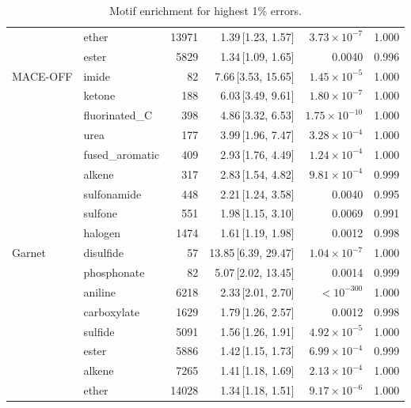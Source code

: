 \begin{table}[t]
\begin{tabular}{llrrrr}
      & ether & 13971 & 1.39\,[1.23, 1.57] & $3.73\times 10^{-7}$ & 1.000 \\
      & ester & 5829 & 1.34\,[1.09, 1.65] & 0.0040 & 0.996 \\
    \hline
    MACE-OFF & imide & 82 & 7.66\,[3.53, 15.65] & $1.45\times 10^{-5}$ & 1.000 \\
      & ketone & 188 & 6.03\,[3.49, 9.61] & $1.80\times 10^{-7}$ & 1.000 \\
      & fluorinated\_C & 398 & 4.86\,[3.32, 6.53] & $1.75\times 10^{-10}$ & 1.000 \\
      & urea & 177 & 3.99\,[1.96, 7.47] & $3.28\times 10^{-4}$ & 1.000 \\
      & fused\_aromatic & 409 & 2.93\,[1.76, 4.49] & $1.24\times 10^{-4}$ & 1.000 \\
      & alkene & 317 & 2.83\,[1.54, 4.82] & $9.81\times 10^{-4}$ & 0.999 \\
      & sulfonamide & 448 & 2.21\,[1.24, 3.58] & 0.0040 & 0.995 \\
      & sulfone & 551 & 1.98\,[1.15, 3.10] & 0.0069 & 0.991 \\
      & halogen & 1474 & 1.61\,[1.19, 1.98] & 0.0012 & 0.998 \\
    \hline
    Garnet & disulfide & 57 & 13.85\,[6.39, 29.47] & $1.04\times 10^{-7}$ & 1.000 \\
      & phosphonate & 82 & 5.07\,[2.02, 13.45] & 0.0014 & 0.999 \\
      & aniline & 6218 & 2.33\,[2.01, 2.70] & $< 10^{-300}$ & 1.000 \\
      & carboxylate & 1629 & 1.79\,[1.26, 2.57] & 0.0012 & 0.998 \\
      & sulfide & 5091 & 1.56\,[1.26, 1.91] & $4.92\times 10^{-5}$ & 1.000 \\
      & ester & 5886 & 1.42\,[1.15, 1.73] & $6.99\times 10^{-4}$ & 0.999 \\
      & alkene & 7265 & 1.41\,[1.18, 1.69] & $2.13\times 10^{-4}$ & 1.000 \\
      & ether & 14028 & 1.34\,[1.18, 1.51] & $9.17\times 10^{-6}$ & 1.000 \\
    \hline
  \end{tabular}
  \caption{Motif enrichment for highest 1\% errors.}
  \label{tab:split_tfd_worst}
\end{table}